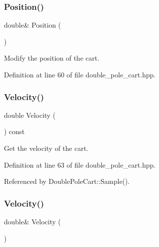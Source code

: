 \subsubsection{Position()\hspace{0.1cm}{\footnotesize\ttfamily [2/2]}}
{\footnotesize\ttfamily double\& Position (\begin{DoxyParamCaption}{ }\end{DoxyParamCaption})\hspace{0.3cm}{\ttfamily [inline]}}



Modify the position of the cart. 



Definition at line 60 of file double\+\_\+pole\+\_\+cart.\+hpp.

\mbox{\label{classmlpack_1_1rl_1_1DoublePoleCart_1_1State_a5281cef88d4e272d6cb8581bff91195a}} 
\subsubsection{Velocity()\hspace{0.1cm}{\footnotesize\ttfamily [1/2]}}
{\footnotesize\ttfamily double Velocity (\begin{DoxyParamCaption}{ }\end{DoxyParamCaption}) const\hspace{0.3cm}{\ttfamily [inline]}}



Get the velocity of the cart. 



Definition at line 63 of file double\+\_\+pole\+\_\+cart.\+hpp.



Referenced by Double\+Pole\+Cart\+::\+Sample().

\mbox{\label{classmlpack_1_1rl_1_1DoublePoleCart_1_1State_a2bdce16cfc8c84b65f13ee9fffab1266}} 
\subsubsection{Velocity()\hspace{0.1cm}{\footnotesize\ttfamily [2/2]}}
{\footnotesize\ttfamily double\& Velocity (\begin{DoxyParamCaption}{ }\end{DoxyParamCaption})\hspace{0.3cm}{\ttfamily [inline]}}




